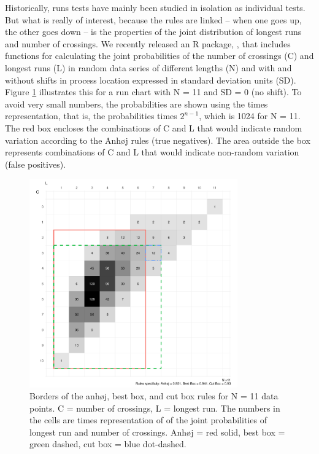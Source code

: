 Historically, runs tests have mainly been studied in isolation as
individual tests. But what is really of interest, because the rules are
linked -- when one goes up, the other goes down -- is the properties of
the joint distribution of longest runs and number of crossings. We
recently released an R package,  \citep{twl2018}, that
includes functions for calculating the joint probabilities of the number
of crossings (C) and longest runs (L) in random data series of different
lengths (N) and with and without shifts in process location expressed in
standard deviation units (SD). Figure \ref{figure:box11} illustrates
this for a run chart with N = 11 and SD = 0 (no shift). To avoid very
small numbers, the probabilities are shown using the times
representation, that is, the probabilities times \(2^{n-1}\), which is
1024 for N = 11. The red box encloses the combinations of C and L that
would indicate random variation according to the Anhøj rules (true
negatives). The area outside the box represents combinations of C and L
that would indicate non-random variation (false positives).

\begin{figure}[htbp]
  \centering
  \includegraphics[width=0.8\textwidth]{fig_box11.pdf}
  \caption{Borders of the anhøj, best box, and cut box rules for N = 11 data points. 
           C = number of crossings, L = longest run.
           The numbers in the cells are times representation of of the joint
           probabilities of longest run and number of crossings.
           Anhøj = red solid, best box = green dashed, cut box = blue dot-dashed.}
  \label{figure:box11}
\end{figure}

